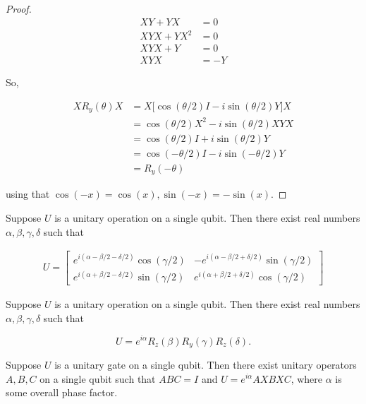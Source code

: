 \documentclass[main.tex]{subfiles}
\begin{document}
\begin{subappendices}
\begin{exercise}
\begin{proof}
	\begin{align*}
	XY + YX &= 0 \\
	XYX + YX^2 &= 0 \\
	XYX + Y &=0 \\
	XYX &= -Y
	\end{align*}

So, 

\begin{align*}
XR_y(\theta)X &= X\big[\cos(\theta/2)I - i\sin(\theta / 2) Y\big]X \\
&= 	\cos(\theta/2)X^2 -i\sin(\theta/2)XYX \\
&= \cos(\theta/2)I + i \sin(\theta /2) Y \\
&= \cos(-\theta/2)I - i \sin(-\theta /2) Y \\
&= R_y(-\theta)
\end{align*}

using that $\cos(-x) = \cos(x), \sin(-x) = -\sin(x)$.
\end{proof}
\end{exercise}


\begin{lemma}\label{4.12}
Suppose $U$ is a unitary operation on a single qubit. Then there exist real numbers $\alpha, \beta, \gamma, \delta$ such that

\begin{align*}
	U = \begin{bmatrix}
 	e^{i(\alpha - \beta / 2 - \delta / 2)} \cos ( \gamma / 2) & -e^{i (\alpha - \beta /2 + \delta / 2)} \sin(\gamma / 2) \\ 
 	e^{i(\alpha + \beta / 2 - \delta / 2)} \sin ( \gamma / 2) & e^{i (\alpha + \beta /2 + \delta / 2)} \cos(\gamma / 2)
 \end{bmatrix}
\end{align*}
\end{lemma}

\begin{theorem}
Suppose $U$ is a unitary operation on a single qubit. Then there exist real numbers $\alpha, \beta, \gamma, \delta$ such that

$$
U = e^{i\alpha}R_z(\beta)R_y(\gamma)R_z(\delta).
$$	
\end{theorem}

\begin{corollary}\label{4.2}
	Suppose $U$ is a unitary gate on a single qubit. Then there exist unitary operators $A, B, C$ on a single qubit such that $ABC = I$ and $U = e^{i\alpha}AXBXC$, where $\alpha$ is some overall phase factor.
\end{corollary}


\end{subappendices}
\end{document}
